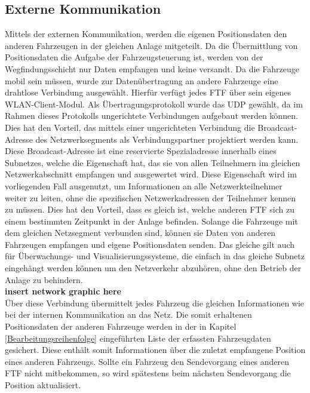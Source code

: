 	\subsection{Externe Kommunikation}
		\label{Externe Kommunikation}
		Mittels der externen Kommunikation, werden die eigenen Positionsdaten den anderen Fahrzeugen in der gleichen Anlage mitgeteilt. Da die Übermittlung von Positionsdaten die Aufgabe der Fahrzeugsteuerung ist, werden von der Wegfindungsschicht nur Daten empfangen und keine versandt. Da die Fahrzeuge mobil sein müssen, wurde zur Datenübertragung an andere Fahrzeuge eine drahtlose Verbindung ausgewählt. Hierfür verfügt jedes \ac{FTF} über sein eigenes \acs{WLAN}-Client-Modul. Als Übertragungsprotokoll wurde das \ac{UDP} gewählt, da im Rahmen dieses Protokolls ungerichtete Verbindungen aufgebaut werden können. Dies hat den Vorteil, das mittels einer ungerichteten Verbindung die Broadcast-Adresse des Netzwerksegments als Verbindungspartner projektiert werden kann.
		\\
		Diese Broadcast-Adresse ist eine reservierte Spezialadresse innerhalb eines Subnetzes, welche die Eigenschaft hat, das sie von allen Teilnehmern im gleichen Netzwerkabschnitt empfangen und ausgewertet wird. Diese Eigenschaft wird im vorliegenden Fall ausgenutzt, um Informationen an alle Netzwerkteilnehmer weiter zu leiten, ohne die spezifischen Netzwerkadressen der Teilnehmer kennen zu müssen. Dies hat den Vorteil, dass es gleich ist, welche anderen \ac{FTF} sich zu einem bestimmten Zeitpunkt in der Anlage befinden. Solange die Fahrzeuge mit dem gleichen Netzsegment verbunden sind, können sie Daten von anderen Fahrzeugen empfangen und eigene Positionsdaten senden. Das gleiche gilt auch für Überwachungs- und Visualisierungssysteme, die einfach in das gleiche Subnetz eingehängt werden können um den Netzverkehr abzuhören, ohne den Betrieb der Anlage zu behindern.
		\\
		\textbf{insert network graphic here}
		\\
		Über diese Verbindung übermittelt jedes Fahrzeug die gleichen Informationen wie bei der internen Kommunikation an das Netz. Die somit erhaltenen Positionsdaten der anderen Fahrzeuge werden in der in Kapitel \ref{Bearbeitungsreihenfolge} eingeführten Liste der erfassten Fahrzeugdaten gesichert. Diese enthält somit Informationen über die zuletzt empfangene Position eines anderen Fahrzeugs. Sollte ein Fahrzeug den Sendevorgang eines anderen \ac{FTF} nicht mitbekommen, so wird spätestens beim nächsten Sendevorgang die Position aktualisiert.
		
